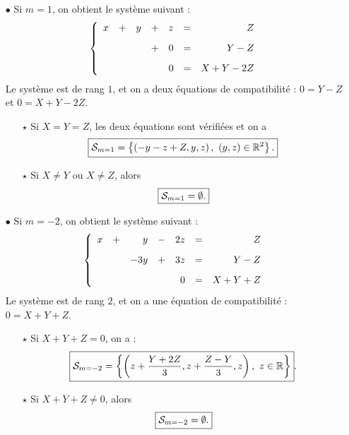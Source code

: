 \documentclass[a4paper, 11pt,reqno]{article}
\begin{document}
\begin{correction}
\begin{enumerate}
\begin{itemize}
\item[$\bullet$] Si $m=1$, on obtient le syst\`eme suivant :
$$\left\lbrace\begin{array}{rrrrrrr}
x &+ & y &+ & z & = & Z\vsec\\
&&&+ & 0 & = & Y-Z\vsec\\
 & & & & 0 & = & X +Y-2Z
 \end{array}\right.$$
Le syst\`eme est de rang $1$, et on a deux \'equations de compatibilit\'e : $0=Y-Z$ et $0=X+Y-2Z$.
\begin{itemize}
\item[$\star$] Si $X=Y=Z$, les deux \'equations sont v\'erifi\'ees et on a 
$$\fbox{$\displaystyle \mathcal{S}_{m=1}=\left\lbrace \left( -y-z+Z,y,z \right),\ (y,z)\in\mathbb{R}^2   \right\rbrace.$}$$
\item[$\star$]  Si $X\not= Y$ ou $X\not=Z$, alors
$$\fbox{$\displaystyle\mathcal{S}_{m=1}=\emptyset.$}$$
\end{itemize}
\item[$\bullet$] Si $m=-2$, on obtient le syst\`eme suivant :
$$\left\lbrace\begin{array}{rrrrrrr}
x &+ & y &-& 2z & = & Z\vsec\\
&& -3y &+ & 3z & = & Y-Z\vsec\\
 & & & & 0 & = & X +Y+Z
\end{array}\right.$$
Le syst\`eme est de rang $2$, et on a une \'equation de compatibilit\'e : $0=X+Y+Z$.
\begin{itemize}
\item[$\star$] Si $X+Y+Z=0$, on a :
$$\fbox{$\ddp\mathcal{S}_{m=-2}=\left\lbrace  \left( z+\ddp\frac{Y+2Z}{3}, z+\ddp\frac{Z-Y}{3},z \right),\ z\in\R  \right\rbrace$}.$$
\item[$\star$] Si $X+Y+Z\not=0$, alors  
$$\fbox{$\displaystyle\mathcal{S}_{m=-2}=\emptyset.$}$$
\end{itemize}
\end{itemize}
 

\end{enumerate}
\end{correction}
\end{document}
